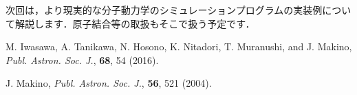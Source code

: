 \documentclass[twocolumn,10pt]{jarticle}
\begin{document}
次回は，より現実的な分子動力学のシミュレーションプログラムの実装例について解説します．原子結合等の取扱もそこで扱う予定です．


\begin{thebibliography}{9}
M. {Iwasawa},  A.  {Tanikawa}, N.  {Hosono}, K. {Nitadori},
T. {Muranushi}, and J. {Makino},
\textit{Publ. Astron. Soc. J.}, {\bf 68}, 54 (2016).

J. {Makino},
\textit{Publ. Astron. Soc. J.}, {\bf 56}, 521 (2004).
\end{thebibliography}


\profile
\end{document}
